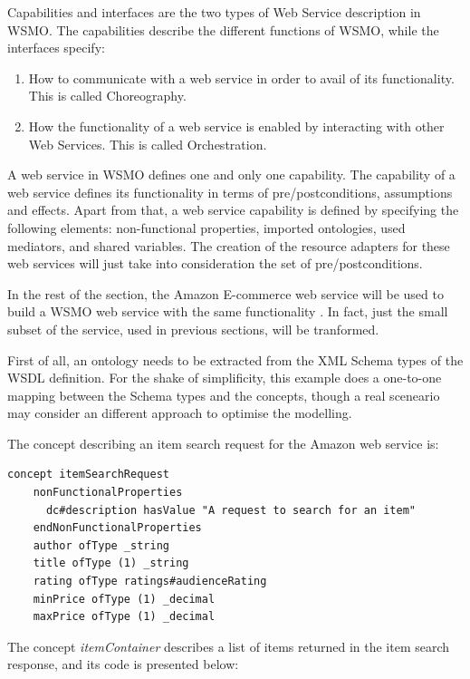 \documentclass{fast_latex}
\begin{document}
Capabilities and interfaces are the two types of Web Service description in WSMO. The capabilities describe the different functions of WSMO, while the interfaces specify:
\begin{enumerate}
	\item How to communicate with a web service in order to avail of its functionality. This is called Choreography.
	\item How the functionality of a web service is enabled by interacting with other Web Services. This is called Orchestration.
\end{enumerate}

A web service in WSMO defines one and only one capability. The capability of a web service defines its functionality in terms of pre/postconditions, assumptions and effects. Apart from that, a web service capability is defined by specifying the following elements: non-functional properties, imported ontologies, used mediators, and shared variables. The creation of the resource adapters for these web services will just take into consideration the set of pre/postconditions.

In the rest of the section, the Amazon E-commerce web service will be used to build a WSMO web service with the same functionality \cite{wsmo_amazon}. In fact, just the small subset of the service, used in previous sections, will be tranformed.

First of all, an ontology needs to be extracted from the XML Schema types of the WSDL definition. For the shake of simplificity, this example does a one-to-one mapping between the Schema types and the concepts, though a real sceneario may consider an different approach to optimise the modelling.

The concept describing an item search request for the Amazon web service is:

\singlespacing
\begin{small}
\begin{verbatim}
concept itemSearchRequest
    nonFunctionalProperties
      dc#description hasValue "A request to search for an item"
    endNonFunctionalProperties
    author ofType _string
    title ofType (1) _string
    rating ofType ratings#audienceRating
    minPrice ofType (1) _decimal
    maxPrice ofType (1) _decimal
\end{verbatim}
\end{small}
\doublespacing

The concept \emph{itemContainer} describes a list of items returned in the item search response, and its code is presented below:
\end{document}

